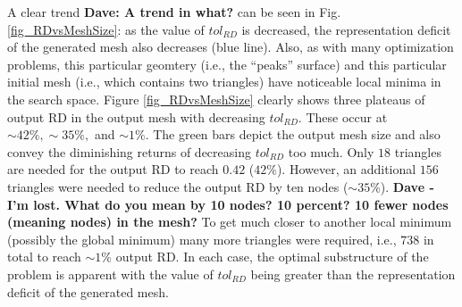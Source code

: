 A clear trend {\bf{Dave: A trend in what?}} can be seen in 
Fig. \ref{fig_RDvsMeshSize}: as the value of
$tol_{RD}$ is decreased, the representation deficit of the generated mesh
also decreases (blue line). Also, as with many optimization problems,
this particular geomtery (i.e., the ``peaks'' surface) and this particular 
initial mesh (i.e., which contains two triangles) have noticeable local 
minima in the search space.
Figure \ref{fig_RDvsMeshSize} clearly shows three plateaus of output
RD in the output mesh with decreasing $tol_{RD}$. These occur at
$\sim42\%, \sim35\%,$ and $\sim1\%$. The green bars depict the output
mesh size and also convey the diminishing returns of decreasing
$tol_{RD}$ too much. Only $18$ triangles are needed for the output RD to
reach $0.42$ ($42\%$). However, an additional $156$ triangles were
needed to reduce the output RD by ten nodes ($\sim 35\%$). {\bf{Dave - 
I'm lost. What do you mean by 10 nodes?  10 percent?  10 fewer nodes 
(meaning nodes) in the mesh?}}  To get much closer to another local 
minimum (possibly the global minimum) many
more triangles were required, i.e., $738$ in total to reach $\sim 1\%$ 
output RD. In each case, the optimal substructure of the problem is 
apparent with the value of $tol_{RD}$ being greater than the 
representation deficit of the generated mesh.
